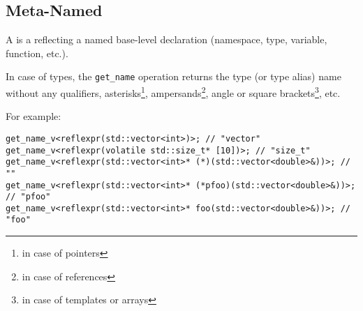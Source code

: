 \subsection{Meta-Named}
\label{concept-Meta-Named}

A  is a  reflecting a named base-level declaration
(namespace, type, variable, function, etc.).





In case of types, the \texttt{get\_name} operation returns the type (or type alias)
name without any qualifiers, asterisks\footnote{in case of pointers},
ampersands\footnote{in case of references}, angle or square brackets\footnote{
in case of templates or arrays}, etc.

For example:

\begin{verbatim}
get_name_v<reflexpr(std::vector<int>)>; // "vector"
get_name_v<reflexpr(volatile std::size_t* [10])>; // "size_t"
get_name_v<reflexpr(std::vector<int>* (*)(std::vector<double>&))>; // ""
get_name_v<reflexpr(std::vector<int>* (*pfoo)(std::vector<double>&))>; // "pfoo"
get_name_v<reflexpr(std::vector<int>* foo(std::vector<double>&))>; // "foo"
\end{verbatim}
